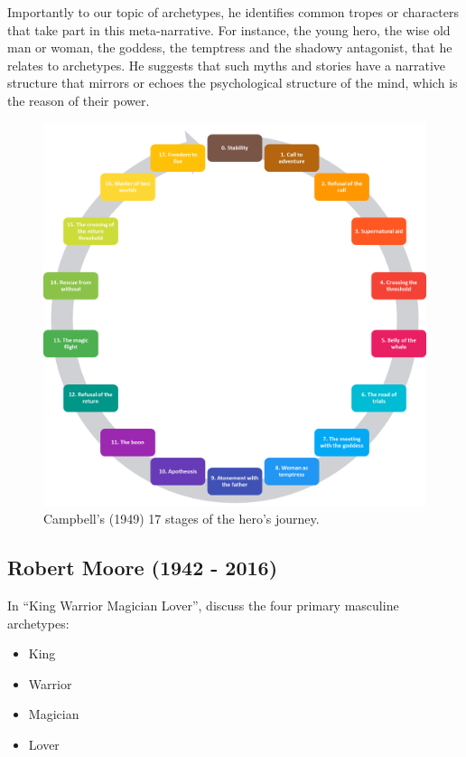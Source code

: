 \documentclass[
]{book}
\providecommand{\tightlist}{%
  \setlength{\itemsep}{0pt}\setlength{\parskip}{0pt}}
\begin{document}
Importantly to our topic of archetypes, he identifies common tropes or characters that take part in this meta-narrative. For instance, the young hero, the wise old man or woman, the goddess, the temptress and the shadowy antagonist, that he relates to archetypes. He suggests that such myths and stories have a narrative structure that mirrors or echoes the psychological structure of the mind, which is the reason of their power.

\begin{figure}

{\centering \includegraphics[width=\textwidth]{img/monomyth} 

}

\caption{Campbell's (1949) 17 stages of the hero's journey.}\label{fig:unnamed-chunk-9}
\end{figure}

\hypertarget{robert-moore-1942---2016}{%
\subsection{Robert Moore (1942 - 2016)}\label{robert-moore-1942---2016}}

In ``King Warrior Magician Lover'', \citet{moore1991king} discuss the four primary masculine archetypes:

\begin{itemize}
\tightlist
\item
  King
\item
  Warrior
\item
  Magician
\item
  Lover
\end{itemize}
\end{document}
